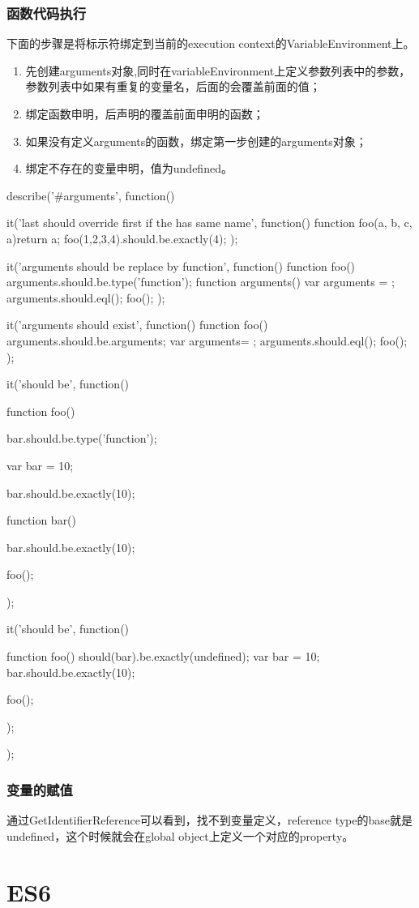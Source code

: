 \subsubsection{函数代码执行}
下面的步骤是将标示符绑定到当前的execution context的VariableEnvironment上。
\begin{enumerate}
\item 先创建arguments对象,同时在variableEnvironment上定义参数列表中的参数，参数列表中如果有重复的变量名，后面的会覆盖前面的值；
\item 绑定函数申明，后声明的覆盖前面申明的函数；
\item 如果没有定义arguments的函数，绑定第一步创建的arguments对象；
\item 绑定不存在的变量申明，值为undefined。
\end{enumerate}

\begin{JavaScript}
	describe('#arguments', function(){
		it('last should override first if the has same name', function(){
			function foo(a, b, c, a){return a;}
			foo(1,2,3,4).should.be.exactly(4);
		});

		it('arguments should be replace by function', function(){
			function foo(){
				arguments.should.be.type('function');
				function arguments(){}
				var arguments = {};
				arguments.should.eql({});
			}
			foo();
		});

		it('arguments should exist', function(){
			function foo(){
				arguments.should.be.arguments;
				var arguments= {};
				arguments.should.eql({});
			}
			foo();
		});

		it('should be', function(){
			function foo(){

				bar.should.be.type('function');

				var bar = 10;

				bar.should.be.exactly(10);

				function bar(){}

				bar.should.be.exactly(10);

			}

			foo();
		});

		it('should be', function(){
			function foo() {
				should(bar).be.exactly(undefined);
				var bar = 10;
				bar.should.be.exactly(10);
			}

			foo();
		});
	});
\end{JavaScript}
\subsubsection{变量的赋值}
通过GetIdentifierReference可以看到，找不到变量定义，reference type的base就是undefined，这个时候就会在global object上定义一个对应的property。


\section{ES6}

